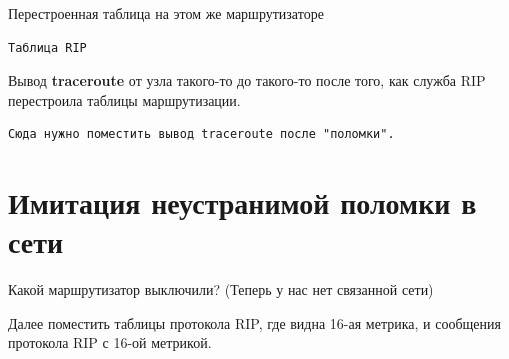 \documentclass[a4paper,12pt]{article}
\begin{document}
Перестроенная таблица на этом же маршрутизаторе

\begin{Verbatim}
Таблица RIP
\end{Verbatim}


Вывод \textbf{traceroute} от узла такого-то до такого-то после того, как служба RIP перестроила таблицы маршрутизации.

\begin{Verbatim}
Сюда нужно поместить вывод traceroute после "поломки".
\end{Verbatim}

\section{Имитация неустранимой поломки в сети}

Какой маршрутизатор выключили? (Теперь у нас нет связанной сети)

Далее поместить таблицы протокола RIP, где видна 16-ая метрика, и сообщения протокола RIP с 16-ой метрикой.
\end{document}
